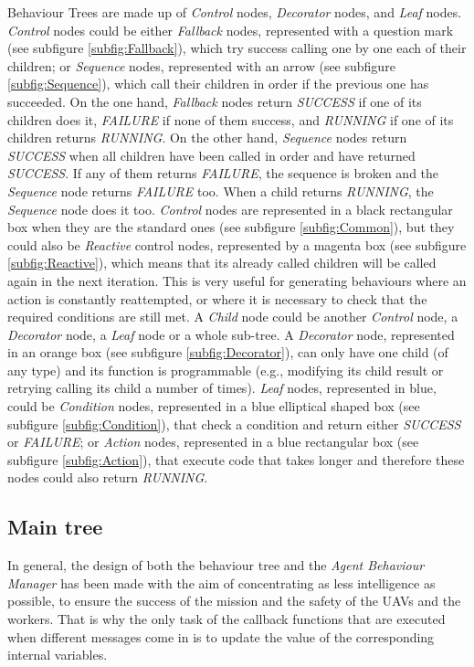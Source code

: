\documentclass[fontsize=11pt, English=false, Español=true, Myfinal=true, twoside, numbers=noenddot]{scrbook}
\begin{document}
{ Behaviour Trees are made up of \emph{Control} nodes, \emph{Decorator} nodes, and \emph{Leaf} nodes. \emph{Control} nodes could be either \emph{Fallback} nodes, represented with a question mark (see subfigure \ref{subfig:Fallback}), which try success calling one by one each of their children; or \emph{Sequence} nodes, represented with an arrow (see subfigure \ref{subfig:Sequence}), which call their children in order if the previous one has succeeded. On the one hand, \emph{Fallback} nodes return \emph{SUCCESS} if one of its children does it, \emph{FAILURE} if none of them success, and \emph{RUNNING} if one of its children returns \emph{RUNNING}. On the other hand, \emph{Sequence} nodes return \emph{SUCCESS} when all children have been called in order and have returned \emph{SUCCESS}. If any of them returns \emph{FAILURE}, the sequence is broken and the \emph{Sequence} node returns \emph{FAILURE} too. When a child returns \emph{RUNNING}, the \emph{Sequence} node does it too. \emph{Control} nodes are represented in a black rectangular box when they are the standard ones (see subfigure \ref{subfig:Common}), but they could also be \emph{Reactive} control nodes, represented by a magenta box (see subfigure \ref{subfig:Reactive}), which means that its already called children will be called again in the next iteration. This is very useful for generating behaviours where an action is constantly reattempted, or where it is necessary to check that the required conditions are still met. A \emph{Child} node could be another \emph{Control} node, a \emph{Decorator} node, a \emph{Leaf} node or a whole sub-tree. A \emph{Decorator} node, represented in an orange box (see subfigure \ref{subfig:Decorator}), can only have one child (of any type) and its function is programmable (e.g., modifying its child result or retrying calling its child a number of times). \emph{Leaf} nodes, represented in blue, could be \emph{Condition} nodes, represented in a blue elliptical shaped box (see subfigure \ref{subfig:Condition}), that check a condition and return either \emph{SUCCESS} or \emph{FAILURE}; or \emph{Action} nodes, represented in a blue rectangular box (see subfigure \ref{subfig:Action}), that execute code that takes longer and therefore these nodes could also return \emph{RUNNING}.

\subsection{Main tree}
\label{sec:MainTree}
In general, the design of both the behaviour tree and the \emph{Agent Behaviour Manager} has been made with the aim of concentrating as less intelligence as possible, to ensure the success of the mission and the safety of the \glspl{UAV} and the workers. That is why the only task of the callback functions that are executed when different messages come in is to update the value of the corresponding internal variables. 

}
\end{document}
